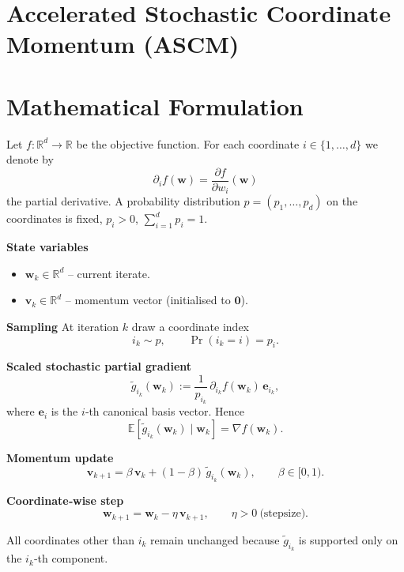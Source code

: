 \documentclass{article}
\newcommand{\E}{\mathbb{E}}
\newcommand{\R}{\mathbb{R}}
\begin{document}
\section*{Accelerated Stochastic Coordinate Momentum (ASCM)}

\section*{Mathematical Formulation}
Let $f:\R^{d}\rightarrow\R$ be the objective function.  
For each coordinate $i\in\{1,\dots ,d\}$ we denote by
\[
\partial_i f(\mathbf w)=\frac{\partial f}{\partial w_i}(\mathbf w)
\]
the partial derivative.  
A probability distribution $p=(p_1,\dots ,p_d)$ on the coordinates is fixed,
$p_i>0$, $\sum_{i=1}^{d}p_i=1$.

\bigskip
\noindent\textbf{State variables}
\begin{itemize}[nosep]
    \item $\mathbf w_k\in\R^{d}$ – current iterate.
    \item $\mathbf v_k\in\R^{d}$ – momentum vector (initialised to $\mathbf 0$).
\end{itemize}
\bigskip

\noindent\textbf{Sampling}  At iteration $k$ draw a coordinate index
\[
i_k\sim p,\qquad \Pr(i_k=i)=p_i .
\]

\noindent\textbf{Scaled stochastic partial gradient}
\[
\tilde g_{i_k}(\mathbf w_k):=\frac{1}{p_{i_k}}\,
\partial_{i_k} f(\mathbf w_k)\, \mathbf e_{i_k},
\]
where $\mathbf e_i$ is the $i$‑th canonical basis vector.  Hence
\[
\E\!\left[\tilde g_{i_k}(\mathbf w_k)\mid\mathbf w_k\right]=\nabla f(\mathbf w_k).
\]

\noindent\textbf{Momentum update}
\[
\mathbf v_{k+1}= \beta\,\mathbf v_k+(1-\beta)\,\tilde g_{i_k}(\mathbf w_k),
\qquad \beta\in[0,1).
\]

\noindent\textbf{Coordinate‑wise step}
\[
\mathbf w_{k+1}= \mathbf w_k-\eta\,\mathbf v_{k+1},
\qquad \eta>0\ \text{(stepsize)} .
\]

All coordinates other than $i_k$ remain unchanged because
$\tilde g_{i_k}$ is supported only on the $i_k$‑th component.
\end{document}
